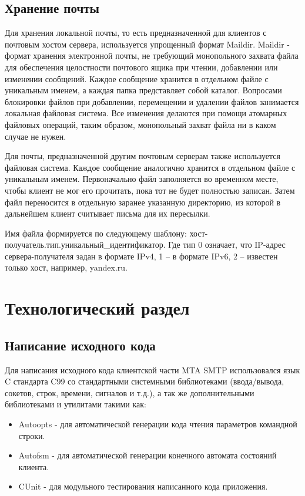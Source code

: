 \documentclass[a4paper,12pt]{report}
\begin{document}
\section{Хранение почты}

Для хранения локальной почты, то есть предназначенной для клиентов с почтовым хостом сервера, используется упрощенный формат Maildir. Maildir - формат хранения электронной почты, не требующий монопольного захвата файла для обеспечения целостности почтового ящика при чтении, добавлении или изменении сообщений. Каждое сообщение хранится в отдельном файле с уникальным именем, а каждая папка представляет собой каталог. Вопросами блокировки файлов при добавлении, перемещении и удалении файлов занимается локальная файловая система. Все изменения делаются при помощи атомарных файловых операций, таким образом, монопольный захват файла ни в каком случае не нужен.

Для почты, предназначенной другим почтовым серверам также используется файловая система. Каждое сообщение аналогично хранится в отдельном файле с уникальным именем. Первоначально файл заполняется во временном месте, чтобы клиент не мог его прочитать, пока тот не будет полностью записан. Затем файл переносится в отдельную заранее указанную директорию, из которой в дальнейшем клиент считывает письма для их пересылки. 

Имя файла формируется по следующему шаблону: хост-получатель.тип.уникальный\_идентификатор. Где тип 0 означает, что IP-адрес сервера-получателя задан в формате IPv4, 1 -- в формате IPv6, 2 -- известен только хост, например, yandex.ru.


\chapter{Технологический раздел}


\section{Написание исходного кода}

Для написания исходного кода клиентской части MTA SMTP использовался язык C стандарта C99 со стандартными системными библиотеками (ввода/вывода, сокетов, строк, времени, сигналов и т.д.), а так же дополнительными библиотеками и утилитами такими как:
\begin{itemize}
    \item Autoopts - для автоматической генерации кода чтения параметров командной строки.
    \item Autofsm - для автоматической генерации конечного автомата состояний клиента.
    \item CUnit - для модульного тестирования написанного кода приложения.
\end{itemize}
\end{document}
